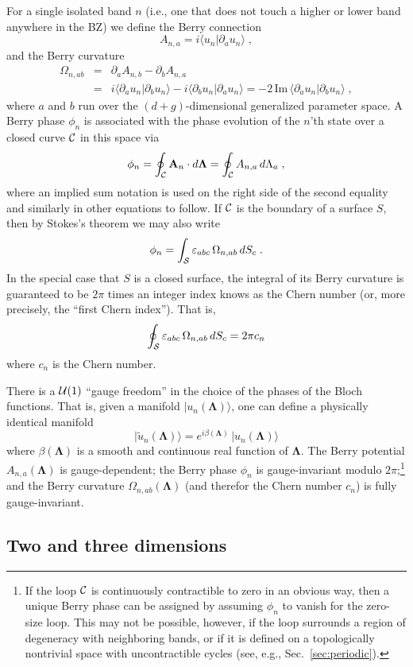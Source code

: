 \documentclass[11pt]{article}
\numberwithin{equation}{section} %
\def\nn{\nonumber\\}
\def\bea{\begin{eqnarray}}
\def\eea{\end{eqnarray}}
\def\beq{\begin{equation}}
\def\eeq{\end{equation}}
\renewcommand{\Im}{\textrm{Im}}
\def\ket#1{\vert #1 \rangle}
\def\ip#1#2{\langle #1 \vert #2 \rangle}
\def\A{{\bf A}}
\def\O{{\Omega}}
\def\pa{\partial_a}
\def\pb{\partial_b}
\def\L{\Lambda}
\def\bL{\mathbf{\Lambda}}
\def\Im{\textrm{Im}\,}
\def\cC{{\cal C}}
\def\cS{{\cal S}}
\def\ve{\varepsilon}
\begin{document}
For a single isolated band $n$ (i.e., one that does not touch a
higher or lower band anywhere in the BZ) we define the Berry connection
%
\beq
A_{n,a}=i\ip{u_n}{\pa u_n} \;,
\eeq
%
and the Berry curvature
%
\bea
\O_{n,ab}&=& \pa A_{n,b}-\pb A_{n,a} \nn
   &=& i\ip{\pa u_n}{\pb u_n}-i\ip{\pb u_n}{\pa u_n}
   = -2\,\Im\ip{\pa u_n}{\pb u_n}\;,
\eea
%
where $a$ and $b$ run over the $(d+g)$-dimensional generalized
parameter space.  A Berry phase $\phi_n$ is associated with the
phase evolution of the $n$'th state over a closed curve $\cC$ in
this space via
%
\beq
\phi_n=\oint_\cC \A_n\cdot d\bL=\oint_\cC  A_{n,a}\,d\L_a \;,
\eeq
%
where an implied sum notation is used on the right side of the
second equality and similarly in other
equations to follow.  If $\cC$ is the boundary of
a surface $S$, then by Stokes's theorem we may also write
%
\beq
\phi_n=\int_\cS \ve_{abc}\,\O_{n,ab}\,dS_c \;.
\label{eq:Oint}
\eeq
%
In the special case that $S$ is a closed surface, the integral
of its Berry curvature is guaranteed to be $2\pi$ times an
integer index knows as the Chern number (or, more precisely,
the ``first Chern index'').  That is,
%
\beq
\oint_\cS \ve_{abc}\,\O_{n,ab}\,dS_c=2\pi c_n
\eeq
%
where $c_n$ is the Chern number.

There is a ${\cal U}(1)$ ``gauge freedom'' in the choice of the
phases of the Bloch functions.  That is, given a manifold
$\ket{u_n(\bL)}$, one can define a physically identical manifold
%
\beq
\ket{\tilde{u}_n(\bL)}=e^{i\beta(\bL)}\,\ket{u_n(\bL)}
\eeq
%
where $\beta(\bL)$ is a smooth and continuous real function of $\bL$.
The Berry potential $A_{n,a}(\bL)$ is gauge-dependent;
the Berry phase $\phi_n$ is gauge-invariant modulo $2\pi$;\footnote{If 
  the loop $\cC$ is continuously contractible to zero in an
  obvious way, then a unique Berry phase can be assigned by
  assuming $\phi_n$ to vanish for the zero-size loop.  This may
  not be possible, however, if the loop surrounds a region
  of degeneracy with neighboring bands, or if it is defined on
  a topologically nontrivial space with uncontractible cycles (see, e.g.,
  Sec.~\ref{sec:periodic}).}
%
and the Berry curvature $\O_{n,ab}(\bL)$ (and therefor the Chern
number $c_n$) is fully gauge-invariant.

\subsection{Two and three dimensions}
\end{document}
